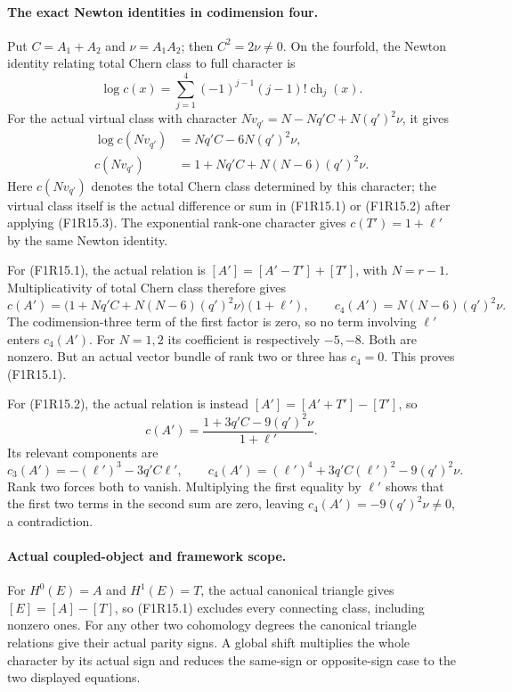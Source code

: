 \paragraph{The exact Newton identities in codimension four.}
Put $C=A_1+A_2$ and $\nu=A_1A_2$; then
$C^2=2\nu\ne0$. On the fourfold, the Newton identity
relating total Chern class to full character is
\[
 \log c(x)=\sum_{j=1}^4(-1)^{j-1}(j-1)!
                      \operatorname{ch}_j(x).
 \tag{F1R15.5}
\]
For the actual virtual class with character
$Nv_{q'}=N-Nq'C+N(q')^2\nu$, it gives
\[
 \begin{split}
 \log c(Nv_{q'})&=Nq'C-6N(q')^2\nu,\\
 c(Nv_{q'})&=1+Nq'C+N(N-6)(q')^2\nu.
 \end{split}
 \tag{F1R15.6}
\]
Here $c(Nv_{q'})$ denotes the total Chern class determined
by this character; the virtual class itself is the actual
difference or sum in (F1R15.1) or (F1R15.2) after applying
(F1R15.3). The exponential rank-one character gives
$c(T')=1+\ell'$ by the same Newton identity.

For (F1R15.1), the actual relation is
$[A']=[A'-T']+[T']$, with $N=r-1$. Multiplicativity
of total Chern class therefore gives
\[
 c(A')=\bigl(1+Nq'C+N(N-6)(q')^2\nu\bigr)(1+\ell'),
 \qquad
                c_4(A')=N(N-6)(q')^2\nu.
 \tag{F1R15.7}
\]
The codimension-three term of the first factor is zero,
so no term involving $\ell'$ enters $c_4(A')$. For
$N=1,2$ its coefficient is respectively $-5,-8$.
Both are nonzero. But an actual vector bundle of rank
two or three has $c_4=0$. This proves (F1R15.1).

For (F1R15.2), the actual relation is instead
$[A']=[A'+T']-[T']$, so
\[
 c(A')=\frac{1+3q'C-9(q')^2\nu}{1+\ell'}.
 \tag{F1R15.8}
\]
Its relevant components are
\[
 c_3(A')=-(\ell')^3-3q'C\ell',\qquad
 c_4(A')=(\ell')^4+3q'C(\ell')^2-9(q')^2\nu.
 \tag{F1R15.9}
\]
Rank two forces both to vanish. Multiplying the first
equality by $\ell'$ shows that the first two terms in
the second sum are zero, leaving
$c_4(A')=-9(q')^2\nu\ne0$, a contradiction.

\paragraph{Actual coupled-object and framework scope.}
For $H^0(E)=A$ and $H^1(E)=T$, the actual canonical
triangle gives $[E]=[A]-[T]$, so (F1R15.1) excludes
every connecting class, including nonzero ones. For
any other two cohomology degrees the canonical triangle
relations give their actual parity signs. A global shift
multiplies the whole character by its actual sign and
reduces the same-sign or opposite-sign case to the two
displayed equations.

